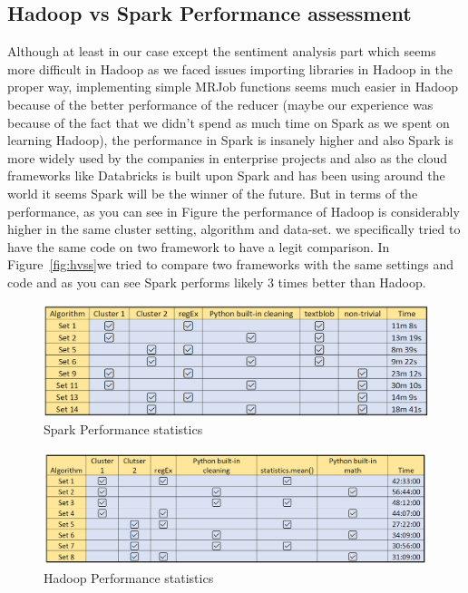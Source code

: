 \subsection{Hadoop vs Spark Performance assessment}
Although at least in our case except the sentiment analysis part which seems more difficult in Hadoop as we faced issues importing libraries in Hadoop in the proper way, implementing simple MRJob functions seems much easier in Hadoop because of the better performance of the reducer (maybe our experience was because of the fact that we didn't spend as much time on Spark as we spent on learning Hadoop), the performance in Spark is insanely higher and also Spark is more widely used by the companies in enterprise projects and also as the cloud frameworks like Databricks is built upon Spark and has been using around the world it seems Spark will be the winner of the future. But in terms of the performance, as you can see in Figure the performance of Hadoop is considerably higher in the same cluster setting, algorithm and data-set. we specifically tried to have the same code on two framework to have a legit comparison. In Figure~\ref{fig:hvss}we tried to compare two frameworks with the same settings and code and as you can see Spark performs likely 3 times better than Hadoop.
\begin{figure}[t]
   \centering
   \includegraphics[width=\linewidth]{fig/sPerformance.png}
    \caption{Spark Performance statistics}
    \label{fig:sPerformance}
\end{figure}


\begin{figure}[t]
   \centering
   \includegraphics[width=\linewidth]{fig/hPerformance.png}
    \caption{Hadoop Performance statistics}
    \label{fig:hPerformance}
\end{figure}


